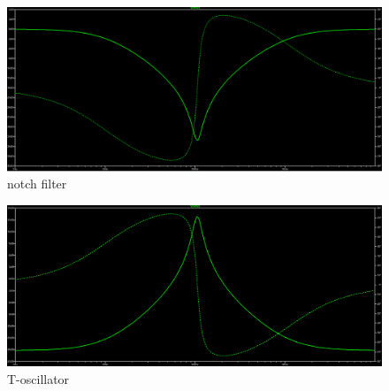 \documentclass{article}
\theoremstyle{definition}
\begin{document}
\begin{figure}[htp]
    \centering
    \includegraphics[width=\textwidth]{../images/notch2.png} 
    \caption{notch filter}
    \label{fig:Notch-filter}
\end{figure}

\begin{figure}[htp]
    \centering
    \includegraphics[width=\textwidth]{../images/toscillatorefrequency.png} 
    \caption{T-oscillator}
    \label{fig:Toscillator-plot}
\end{figure}
\end{document}
